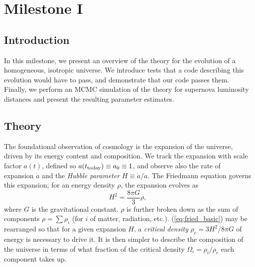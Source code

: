 \documentclass[aps,prl,twocolumn,groupedaddress,nofootinbib]{revtex4-2}
\begin{document}
\section{Milestone I}
\subsection{Introduction}
In this milestone, we present an overview of the theory for the evolution of a homogeneous, isotropic universe. We introduce tests that a code describing this evolution would have to pass, and demonstrate that our code passes them. Finally, we perform an MCMC simulation of the theory for supernova luminosity distances and present the resulting parameter estimates.
\subsection{Theory}
The foundational observation of cosmology is the expansion of the universe, driven by its energy content and composition. We track the expansion with scale factor $a(t)$, defined so $a(t_{\rm today})\equiv a_0\equiv 1$, and observe also the rate of expansion $\dot{a}$ and the \textit{Hubble parameter} $H\equiv\dot{a}/a$. The Friedmann equation governs this expansion; for an energy density $\rho$, the expansion evolves as
\begin{equation}
    \label{eq:fried_basic}
    H^2=\frac{8\pi G}{3}\rho,
\end{equation}
where $G$ is the gravitational constant. $\rho$ is further broken down as the sum of components $\rho=\sum \rho_i$ (for $i$ of matter, radiation, etc.). (\ref{eq:fried_basic}) may be rearranged so that for a given expansion $H$, a \textit{critical density} $\rho_c=3H^2/8\pi G$ of energy is necessary to drive it. It is then simpler to describe the composition of the universe in terms of what fraction of the critical density $\Omega_i=\rho_i/\rho_c$ each component takes up.
\end{document}

